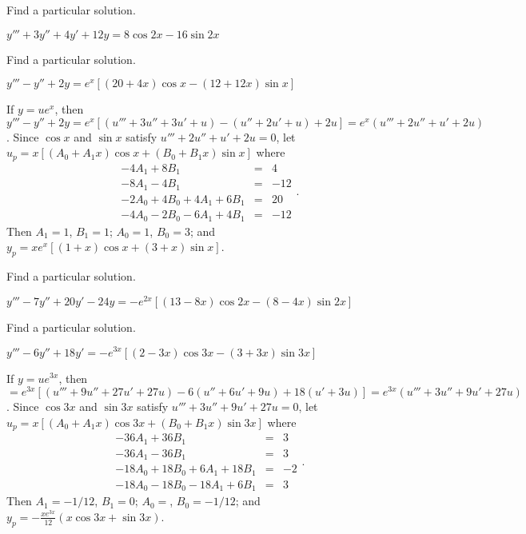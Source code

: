 \documentclass{ximera}
\begin{document}
\begin{problem}\label{exer:9.3.33}   Find a particular solution.

$y'''+3y''+4y'+12y=8\cos2x-16\sin2x$
\end{problem}

\begin{problem}\label{exer:9.3.34}   Find a particular solution. 

$y'''-y''+2y=e^x[(20+4x)\cos x-(12+12x)\sin
 x]$

 \begin{solution}
 If $y=ue^x$, then
$y'''-y''+2y=e^x[
(u'''+3u''+3u'+u) -(u''+2u'+u) +2u]
=e^x(u'''+2u''+u'+2u)$.
Since $\cos x$ and $\sin x$ satisfy  $u'''+2u''+u'+2u=0$,
let  $u_p=x[(A_0+A_1x)\cos x+(B_0+B_1x)\sin x]$ where
$$
\begin{array}{rcl}
-4A_1+8B_1&=&4\\
-8A_1-4B_1&=&-12\\
-2A_0+4B_0+4A_1+6B_1&=&20\\
-4A_0-2B_0-6A_1+4B_1&=&-12
\end{array}.
$$
Then $A_1=1$, $B_1=1$; $A_0=1$, $B_0=3$; and
 $y_p=xe^x[(1+x)\cos x+(3+x)\sin x]$.
 \end{solution}
\end{problem}
 
\begin{problem}\label{exer:9.3.35}   Find a particular solution.

$y'''-7y''+20y'-24y=-e^{2x}[(13-8x)\cos
2x-(8-4x)\sin2x]$
\end{problem}

\begin{problem}\label{exer:9.3.36}   Find a particular solution. 

$y'''-6y''+18y'=-e^{3x}[(2-3x)\cos
3x-(3+3x)\sin3x]$

\begin{solution}
If $y=ue^{3x}$, then
$=e^{3x}[
(u'''+9u''+27u'+27u) -6(u''+6u'+9u) +18(u'+3u)]
=e^{3x}(u'''+3u''+9u'+27u)$.
Since $\cos3x$ and $\sin3x$ satisfy  $u'''+3u''+9u'+27u=0$,
let  $u_p=x[(A_0+A_1x)\cos3x+(B_0+B_1x)\sin3x]$ where
$$
\begin{array}{rcr}
-36A_1+36B_1&=&3\\
-36A_1-36B_1&=&3\\
-18A_0+18B_0+6A_1+18B_1&=&-2\\
-18A_0-18B_0-18A_1+6B_1&=&3
\end{array}.
$$
Then  $A_1=-1/12$, $B_1=0$; $A_0=$, $B_0=-1/12$; and
 $y_p=-\frac{xe^{3x}}{12}(x\cos3x+\sin3x)$.
\end{solution}
\end{problem}
\end{document}

